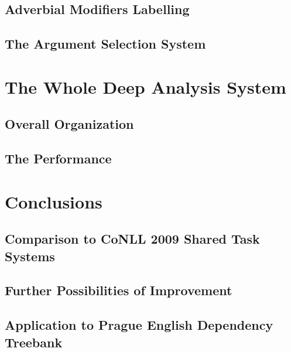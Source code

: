 \documentclass[12pt,notitlepage]{report}
\begin{document}
\section{Adverbial Modifiers Labelling}
\section{The Argument Selection System}

\chapter{The Whole Deep Analysis System}\label{setup}
\section{Overall Organization}
\section{The Performance}

\chapter{Conclusions}\label{conclusions}
\section{Comparison to CoNLL 2009 Shared Task Systems}
\section{Further Possibilities of Improvement}
\section{Application to Prague English Dependency Treebank}

\cleardoublepage
{}
\printnomenclature[2cm]
\cleardoublepage


\end{document}
